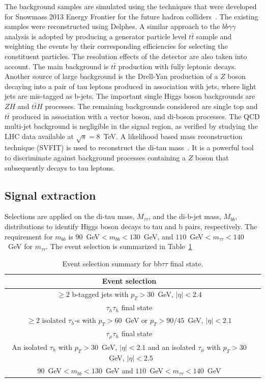 The background samples are simulated using the techniques that were developed for Snowmass 2013 Energy Frontier for the future hadron colliders~\cite{Avetisyan}. The existing samples were reconstructed using Delphes. A similar approach to the $bb\gamma\gamma$ analysis is adopted by producing a generator particle level $t\bar{t}$ sample and weighting the events by their corresponding efficiencies for selecting the constituent particles. The resolution effects of the detector are also taken into account. The main background is $t\bar{t}$ production with fully leptonic decays. Another source of large background is the Drell-Yan
production of a $Z$ boson decaying into a pair of tau leptons
produced in association with jets, where light jets are mis-tagged as
b-jets. The important single Higgs boson backgrounds are $ZH$ and  $t\bar{t}H$ processes. The remaining backgrounds considered are single top and $t\bar{t}$
produced in association with a vector boson, and di-boson processes.
The QCD multi-jet background is negligible in the signal region, as verified by studying the LHC data available at $\sqrt{s} = 8$~TeV. A likelihood based mass reconstruction technique (SVFIT) is used to reconstruct the di-tau mass~\cite{Chatrchyan:2014nva}. It is a powerful tool to discriminate against background processes containing a $Z$ boson that subsequently decays to tau leptons. 

\subsection {Signal extraction}
 Selections are applied on the di-tau
mass,
$M_{\tau\tau}$, and the di-b-jet mass, $M_{bb}$, distributions to identify
Higgs boson decays to tau and b pairs, respectively. The requirement
for $m_{bb}$ is $90$~GeV$<m_{bb}<130$~GeV, and
$110$~GeV$<m_{\tau\tau}<140$~GeV for $m_{\tau\tau}$. The event selection is summarized in Table~\ref{tab:event_selection} 

\begin{table}[!ht]
\begin{center} 
\begin{tabular}{|c|c|}
\hline
Event selection                                    \\ \hline
$\geq 2$ b-tagged jets with $p_{T}>30$~GeV, $|\eta|<2.4$ \\ \hline
$\tau_{h}\tau_{h}$ final state                     \\ 
$\geq 2$ isolated $\tau_{h}$-s with $p_{T}>60$~GeV or $p_{T}>90/45$~GeV, $|\eta|<2.1$  \\ \hline
$\tau_{\mu}\tau_{h}$ final state                     \\ 
An isolated $\tau_{h}$ with $p_{T}>30$~GeV, $|\eta|<2.1$ and an isolated $\tau_{\mu}$ with  $p_{T}>30$~GeV, $|\eta|<2.5$ \\ \hline 
 $90$~GeV$<m_{bb}<130$~GeV and $110$~GeV$<m_{\tau\tau}<140$~GeV \\ \hline
\end{tabular}
\caption{ Event selection summary for bb$\tau\tau$ final state.}
\label{tab:event_selection}
\end{center}
\end{table}

